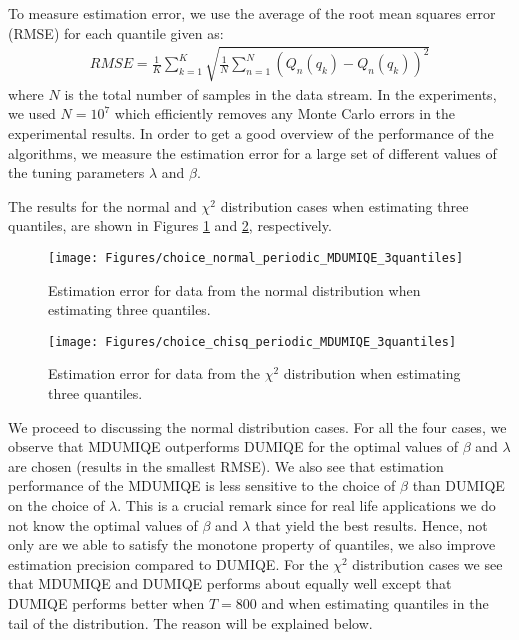 \documentclass[10pt, a4paper]{article}
\newtheorem{rational for conjecture}{Rational for Conjecture}
\begin{document}
To measure estimation error, we use the average of the root mean squares error (RMSE) for each quantile given as:
\begin{align}
  \label{eq:27}
  RMSE =  \frac{1}{K} \sum_{k=1}^K  \sqrt{ \frac{1}{N}\sum_{n=1}^N \left(Q_n(q_k) - \widehat{Q_n}(q_k)\right)^2 }
\end{align}
where $N$ is the total number of samples in the data stream. In the experiments, we used $N = 10^7$ which efficiently removes any Monte Carlo errors in the experimental results. In order to get a good overview of the performance of the algorithms, we measure the estimation error for a large set of different values of the tuning parameters $\lambda$ and $\beta$.

The results for the normal and $\chi^2$ distribution cases when estimating three quantiles, are shown in Figures \ref{fig:3} and \ref{fig:4}, respectively.
\begin{figure}
  \centering
  \texttt{[image: Figures/choice\_normal\_periodic\_MDUMIQE\_3quantiles]}
  \caption{Estimation error for data from the normal distribution when estimating three quantiles.}
  \label{fig:3}
\end{figure}
\begin{figure}
  \centering
  \texttt{[image: Figures/choice\_chisq\_periodic\_MDUMIQE\_3quantiles]}
  \caption{Estimation error for data from the $\chi^2$ distribution when estimating three quantiles.}
  \label{fig:4}
\end{figure}

We proceed to discussing the normal distribution cases. For all the four cases, we observe that MDUMIQE outperforms DUMIQE for the optimal values of $\beta$ and $\lambda$ are chosen (results in the smallest RMSE). We also see that estimation performance of the MDUMIQE is less sensitive to the choice of $\beta$ than DUMIQE on the choice of $\lambda$. This is a crucial remark since for real life applications we do not know the optimal values of $\beta$ and $\lambda$ that yield the best results. Hence, not only are we able to satisfy the monotone property of quantiles, we also improve estimation precision compared to DUMIQE. For the $\chi^2$ distribution cases we see that MDUMIQE and DUMIQE performs about equally well except that DUMIQE performs better when $T = 800$ and when estimating quantiles in the tail of the distribution. The reason will be explained below.
\end{document}
